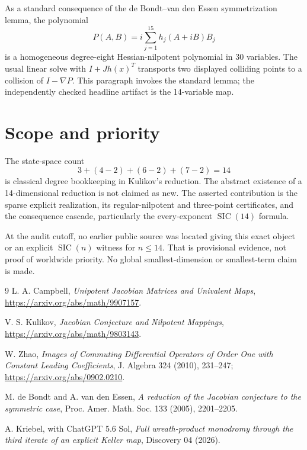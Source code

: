 \documentclass[11pt]{article}
\newcommand{\SIC}{\operatorname{SIC}}
\begin{document}
As a standard consequence of the de Bondt--van den Essen symmetrization
lemma, the polynomial
\begin{equation}
 P(A,B)=i\sum_{j=1}^{15}h_j(A+iB)B_j \label{eq:P}
\end{equation}
is a homogeneous degree-eight Hessian-nilpotent polynomial in 30 variables.
The usual linear solve with $I+Jh(x)^T$ transports two displayed colliding
points to a collision of $I-\nabla P$.  This paragraph invokes the standard
lemma; the independently checked headline artifact is the 14-variable map.

\section{Scope and priority}

The state-space count
\[
 3+(4-2)+(6-2)+(7-2)=14
\]
is classical degree bookkeeping in Kulikov's reduction.  The abstract
existence of a 14-dimensional reduction is not claimed as new.  The asserted
contribution is the sparse explicit realization, its regular-nilpotent and
three-point certificates, and the consequence cascade, particularly the
every-exponent $\SIC(14)$ formula.

At the audit cutoff, no earlier public source was located giving this exact
object or an explicit $\SIC(n)$ witness for $n\leq14$.  That is provisional
evidence, not proof of worldwide priority.  No global smallest-dimension or
smallest-term claim is made.

\begin{thebibliography}{9}
L. A. Campbell,
\emph{Unipotent Jacobian Matrices and Univalent Maps},
\url{https://arxiv.org/abs/math/9907157}.

V. S. Kulikov,
\emph{Jacobian Conjecture and Nilpotent Mappings},
\url{https://arxiv.org/abs/math/9803143}.

W. Zhao,
\emph{Images of Commuting Differential Operators of Order One with
Constant Leading Coefficients},
J. Algebra 324 (2010), 231--247;
\url{https://arxiv.org/abs/0902.0210}.

M. de Bondt and A. van den Essen,
\emph{A reduction of the Jacobian conjecture to the symmetric case},
Proc. Amer. Math. Soc. 133 (2005), 2201--2205.

A. Kriebel, with ChatGPT 5.6 Sol,
\emph{Full wreath-product monodromy through the third iterate of an explicit
Keller map}, Discovery 04 (2026).
\end{thebibliography}
\end{document}
